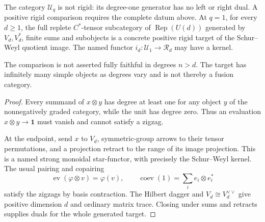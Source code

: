 \begin{theorem}
{\normalfont\statusProved}\quad The category $\mathcal U_q$ is not rigid:
its degree-one generator has no left or right dual.  A positive rigid
comparison requires the complete datum above.  At $q=1$, for every $d\geq1$,
the full replete $C^*$-tensor subcategory of $\operatorname{Rep}(U(d))$
generated by $V_d,V_d^*$, finite sums and subobjects is a concrete positive
rigid target of the Schur--Weyl quotient image.  The named functor
$i_d:\mathcal U_1\to\mathcal R_d$ may have a kernel.
\end{theorem}
\begin{scope}
The comparison is not asserted fully faithful in degrees $n>d$.  The target
has infinitely many simple objects as degrees vary and is not thereby a
fusion category.
\end{scope}
\begin{proof}
Every summand of $x\otimes y$ has degree at least one for any object $y$ of
the nonnegatively graded category, while the unit has degree zero.  Thus an
evaluation $x\otimes y\to\mathbf1$ must vanish and cannot satisfy a zigzag.

At the endpoint, send $x$ to $V_d$, symmetric-group arrows to their tensor
permutations, and a projection retract to the range of its image projection.
This is a named strong monoidal star-functor, with precisely the
Schur--Weyl kernel.  The usual pairing and copairing
\[
 \operatorname{ev}(\varphi\otimes v)=\varphi(v),\qquad
 \operatorname{coev}(1)=\sum_i e_i\otimes e_i^*
\]
satisfy the zigzags by basis contraction.  The Hilbert dagger and
$V_d\cong V_d^{\vee\vee}$ give positive dimension $d$ and ordinary matrix trace.
Closing under sums and retracts supplies duals for the whole generated
target.
\end{proof}

